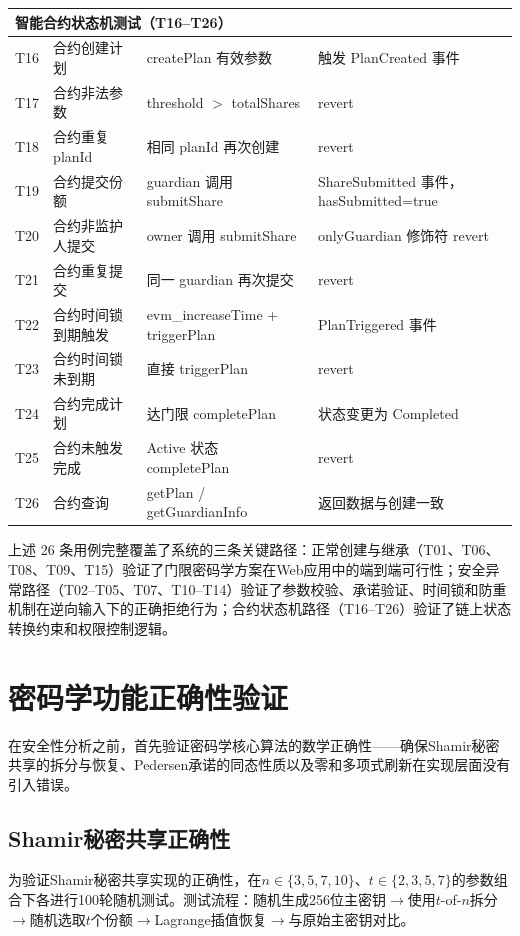 \documentclass[UTF8,a4paper,zihao=-4,openany]{ctexrep}
\begin{document}
\begin{longtable}{p{2.5cm}p{3.8cm}p{3.8cm}p{4.5cm}}
\midrule
\multicolumn{4}{l}{\textbf{智能合约状态机测试（T16--T26）}}\\
\midrule
T16 & 合约创建计划 & createPlan 有效参数 & 触发 PlanCreated 事件\\
T17 & 合约非法参数 & threshold $>$ totalShares & revert\\
T18 & 合约重复 planId & 相同 planId 再次创建 & revert\\
T19 & 合约提交份额 & guardian 调用 submitShare & ShareSubmitted 事件，hasSubmitted=true\\
T20 & 合约非监护人提交 & owner 调用 submitShare & onlyGuardian 修饰符 revert\\
T21 & 合约重复提交 & 同一 guardian 再次提交 & revert\\
T22 & 合约时间锁到期触发 & evm\_increaseTime + triggerPlan & PlanTriggered 事件\\
T23 & 合约时间锁未到期 & 直接 triggerPlan & revert\\
T24 & 合约完成计划 & 达门限 completePlan & 状态变更为 Completed\\
T25 & 合约未触发完成 & Active 状态 completePlan & revert\\
T26 & 合约查询 & getPlan / getGuardianInfo & 返回数据与创建一致\\
\bottomrule
\end{longtable}

上述 26 条用例完整覆盖了系统的三条关键路径：正常创建与继承（T01、T06、T08、T09、T15）验证了门限密码学方案在Web应用中的端到端可行性；安全异常路径（T02--T05、T07、T10--T14）验证了参数校验、承诺验证、时间锁和防重机制在逆向输入下的正确拒绝行为；合约状态机路径（T16--T26）验证了链上状态转换约束和权限控制逻辑。

\section{密码学功能正确性验证}
\label{sec:crypto_correctness}

在安全性分析之前，首先验证密码学核心算法的数学正确性——确保Shamir秘密共享的拆分与恢复、Pedersen承诺的同态性质以及零和多项式刷新在实现层面没有引入错误。

\subsection{Shamir秘密共享正确性}

为验证Shamir秘密共享实现的正确性，在$n \in \{3, 5, 7, 10\}$、$t \in \{2, 3, 5, 7\}$的参数组合下各进行100轮随机测试。测试流程：随机生成256位主密钥$\to$使用$t$-of-$n$拆分$\to$随机选取$t$个份额$\to$Lagrange插值恢复$\to$与原始主密钥对比。
\end{document}
